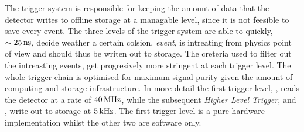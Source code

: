 The trigger system is responsible for keeping the amount of data that the detector writes to offline storage
at a managable level, since it is not feesible to save every event. The three levels of the \lhcb trigger system
are able to quickly, $\sim 25{\rm \,ns}$, decide weather a certain colsion, {\it event}, is intreating from physics point
of view and should thus be writen out to storage. The creteria used to filter out the intreasting events, get
progresively more stringent at each trigger level. The whole trigger chain is optimised for maximum
signal purity given the amount of computing and storage infrastructure. In more detail the first trigger
level, \lzero, reads the detector at a rate of $40{\rm \,MHz}$, while the subsequent {\it Higher Level Trigger},
\hltone and \hlttwo, write out to storage at $5{\rm \,kHz}$. The first trigger level is a pure hardware
implementation whilst the other two are software only.

